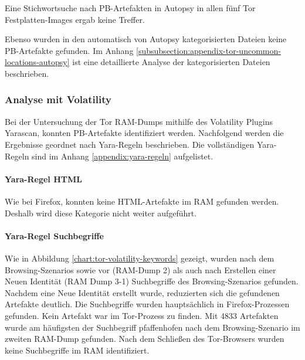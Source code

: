 Eine Stichwortsuche nach PB-Artefakten in Autopsy in allen fünf Tor Festplatten-Images ergab keine Treffer.

Ebenso wurden in den automatisch von Autopsy kategorisierten Dateien keine PB-Artefakte gefunden. 
Im Anhang \ref{subsubsection:appendix-tor-uncommon-locations-autopsy} ist eine detaillierte Analyse der kategorisierten Dateien beschrieben.


\subsubsection*{Analyse mit Volatility}
Bei der Untersuchung der Tor RAM-Dumps mithilfe des Volatility Plugins Yarascan, konnten PB-Artefakte identifiziert werden.
Nachfolgend werden die Ergebnisse geordnet nach Yara-Regeln beschrieben. Die vollständigen Yara-Regeln sind im Anhang \ref{appendix:yara-regeln} aufgelistet.

\paragraph*{Yara-Regel \grqq{}HTML\grqq{}}
Wie bei Firefox, konnten keine HTML-Artefakte im RAM gefunden werden. Deshalb wird diese Kategorie nicht weiter aufgeführt.

\paragraph*{Yara-Regel \grqq{}Suchbegriffe\grqq{}}
Wie in Abbildung \ref{chart:tor-volatility-keywords} gezeigt, wurden nach dem Browsing-Szenarios sowie vor (RAM-Dump 2) als auch nach Erstellen einer \grqq{}Neuen Identität\grqq{} (RAM Dump 3-1) Suchbegriffe des Browsing-Szenarios gefunden.
Nachdem eine \grqq{}Neue Identität\grqq{} erstellt wurde, reduzierten sich die gefundenen Artefakte deutlich. 
Die Suchbegriffe wurden hauptsächlich in Firefox-Prozessen gefunden. Kein Artefakt war im Tor-Prozess zu finden.
Mit 4833 Artefakten wurde am häufigsten der Suchbegriff \grqq{}pfaffenhofen\grqq{} nach dem Browsing-Szenario im zweiten RAM-Dump gefunden. 
Nach dem Schließen des Tor-Browsers wurden keine Suchbegriffe im RAM identifiziert.

